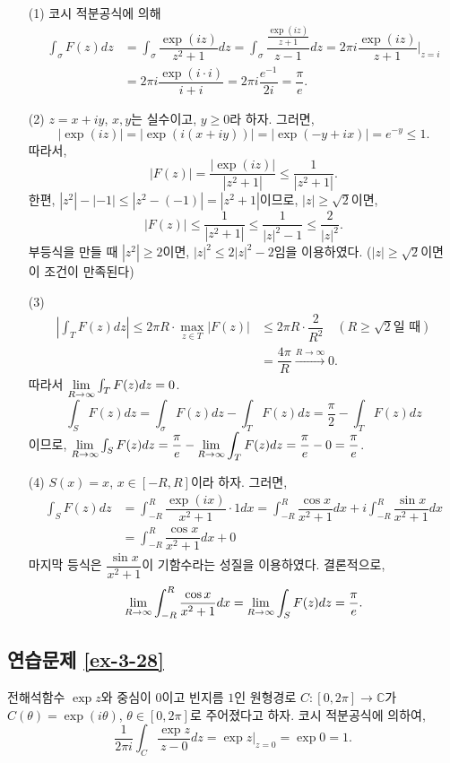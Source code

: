 \begin{itemize}
\item[(1)] 코시 적분공식에 의해
\begin{align*}
\int_\sigma F(z) dz &= \int_\sigma \dfrac{\exp(iz)}{z^2+1}dz
= \int_\sigma \dfrac{\frac{\exp(iz)}{z+1}}{z-1}dz
= 2\pi i \dfrac{\exp(iz)}{z+1}\Big|_{z=i} \\
&= 2\pi i \dfrac{\exp(i\cdot i)}{i+i} = 2\pi i \dfrac{e^{-1}}{2i} = \dfrac\pi e.
\end{align*}

\item[(2)] $z=x+iy$, $x,y$는 실수이고, $y\ge0$라 하자. 그러면,
\[
|\exp(iz)| = |\exp(i(x+iy))| = |\exp(-y+ix)| = e^{-y} \le 1.
\]
따라서,
\[
|F(z)| = \dfrac{|\exp(iz)|}{|z^2+1|} \le \dfrac1{|z^2+1|}.
\]
한편, $|z^2| - |-1| \le |z^2-(-1)| = |z^2+1|$이므로,
$|z|\ge\sqrt{2}$이면,
\[
|F(z)| \le \dfrac1{|z^2+1|} \le \dfrac1{|z|^2-1} \le \dfrac2{|z|^2}.
\]
부등식을 만들 때 $|z^2|\ge 2$이면, $|z|^2\le 2|z|^2 -2$임을 이용하였다.
($|z|\ge\sqrt{2}$이면 이 조건이 만족된다)
\item[(3)] 
\begin{align*}
\left| \int_T F(z)dz \right| 
\le 2\pi R\cdot \max_{z\in T} |F(z)| &\le 2\pi R\cdot \dfrac 2{R^2} 
\quad (R\ge\sqrt{2}\text{일 때})\\
&= \dfrac{4\pi}R \stackrel{R\to\infty}{\longrightarrow} 0.
\end{align*}
따라서 $\lim\limits_{R\to\infty} \int_T F(z) dz = 0$.
\[
\int_S F(z)dz = \int_\sigma F(z) dz - \int_T F(z)dz = \dfrac \pi 2 -  \int_T F(z)dz
\]
이므로,  $\lim\limits_{R\to\infty} \int_S F(z)dz = \displaystyle\frac\pi e -\lim\limits_{R\to\infty} \int_T F(z)dz
= \displaystyle\frac \pi e - 0 = \displaystyle\frac \pi e$.
\item[(4)] $S(x)=x$, $x\in[-R,R]$이라 하자. 그러면,
\begin{align*}
\int_S F(z)dz &= \int_{-R}^R \dfrac{\exp(ix)}{x^2+1}\cdot 1 dx
=\int_{-R}^R \dfrac{\cos x}{x^2+1} dx 
+ i\int_{-R}^R \dfrac{\sin x}{x^2+1} dx \\
&= \int_{-R}^R \dfrac{\cos x}{x^2+1}dx  + 0
\end{align*}
마지막 등식은 $\dfrac{\sin x}{x^2+1}$이 기함수라는 성질을 이용하였다.
결론적으로,
\[
\lim\limits_{R\to\infty} \int_{-R}^R \displaystyle\frac{\cos x}{x^2+1}dx
= \lim\limits_{R\to\infty}\int_S F(z)dz = \displaystyle\frac \pi e.
\]
\end{itemize}

\subsection*{연습문제 \ref{ex-3-28}}

전해석함수 $\exp z$와 중심이 $0$이고 빈지름 $1$인 원형경로
$C:[0,2\pi] \to \mathbb C$가 $C(\theta) = \exp(i\theta)$, $\theta \in [0,2\pi]$로 
주어졌다고 하자.
코시  적분공식에 의하여,
\[
\dfrac1{2\pi i} \int_C \dfrac{\exp z}{z-0}dz = \exp z\Big|_{z=0} = \exp 0 = 1.
\]

%



